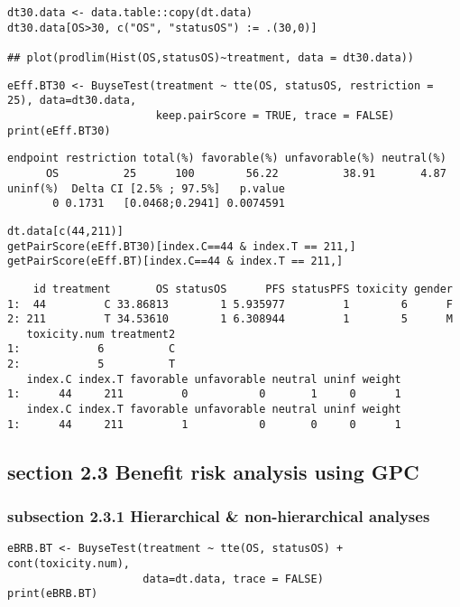 \documentclass[12pt]{article}
\begin{document}
\lstset{language=r,label= ,caption= ,captionpos=b,numbers=none}
\begin{lstlisting}
dt30.data <- data.table::copy(dt.data)
dt30.data[OS>30, c("OS", "statusOS") := .(30,0)]

## plot(prodlim(Hist(OS,statusOS)~treatment, data = dt30.data))
\end{lstlisting}

\lstset{language=r,label= ,caption= ,captionpos=b,numbers=none}
\begin{lstlisting}
eEff.BT30 <- BuyseTest(treatment ~ tte(OS, statusOS, restriction = 25), data=dt30.data,
                       keep.pairScore = TRUE, trace = FALSE)
print(eEff.BT30)
\end{lstlisting}

\begin{verbatim}
endpoint restriction total(%) favorable(%) unfavorable(%) neutral(%)
      OS          25      100        56.22          38.91       4.87
uninf(%)  Delta CI [2.5% ; 97.5%]   p.value
       0 0.1731   [0.0468;0.2941] 0.0074591
\end{verbatim}


\lstset{language=r,label= ,caption= ,captionpos=b,numbers=none}
\begin{lstlisting}
dt.data[c(44,211)]
getPairScore(eEff.BT30)[index.C==44 & index.T == 211,]
getPairScore(eEff.BT)[index.C==44 & index.T == 211,]
\end{lstlisting}

\begin{verbatim}
    id treatment       OS statusOS      PFS statusPFS toxicity gender
1:  44         C 33.86813        1 5.935977         1        6      F
2: 211         T 34.53610        1 6.308944         1        5      M
   toxicity.num treatment2
1:            6          C
2:            5          T
   index.C index.T favorable unfavorable neutral uninf weight
1:      44     211         0           0       1     0      1
   index.C index.T favorable unfavorable neutral uninf weight
1:      44     211         1           0       0     0      1
\end{verbatim}

\subsection{section 2.3 Benefit risk analysis using GPC}
\label{sec:org114c8d2}

\subsubsection{subsection 2.3.1 Hierarchical \& non-hierarchical analyses}
\label{sec:org023ff62}
\lstset{language=r,label= ,caption= ,captionpos=b,numbers=none}
\begin{lstlisting}
eBRB.BT <- BuyseTest(treatment ~ tte(OS, statusOS) + cont(toxicity.num),
                     data=dt.data, trace = FALSE)
print(eBRB.BT)
\end{lstlisting}
\end{document}

